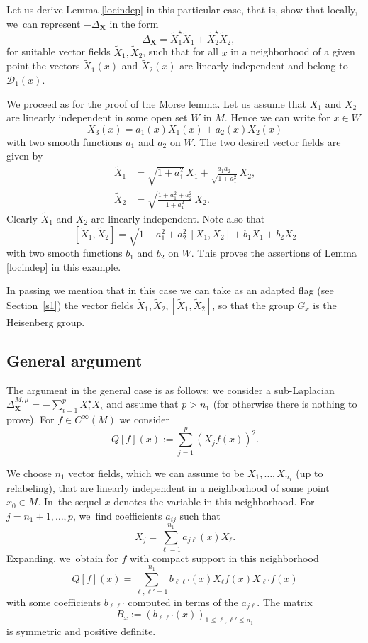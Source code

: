 \documentclass[11pt]{article}
\newcommand{\bX}{{\boldsymbol{X}}}
\theoremstyle{definition}
\let\Xb\bX
\newcommand{\1}{\mathbbm{1}}
\numberwithin{equation}{section}
\begin{document}
Let us derive Lemma \ref{locindep} in this particular case, that is, show that locally, we~can represent $-\Delta_\Xb$ in the form
\[
- \Delta_\Xb = \tilde X_1^\star \tilde X_1 + \tilde X_2^\star \tilde X_2,
\]
for suitable vector fields $\tilde X_1,\tilde X_2$, such that for all $x$ in a neighborhood of a given point the vectors $\tilde X_1(x)$ and $\tilde X_2(x)$ are linearly independent and belong to $\mathcal D_1(x)$.

We proceed as for the proof of the Morse lemma. Let us assume that $X_1$ and $X_2$ are linearly independent in some open set $W$ in $M$. Hence we can write for $x\in W$
\[
X_3(x) = a_1(x) X_1(x) + a_2(x) X_2(x)
\]
with two smooth functions $a_1$ and $a_2$ on $W$. The two desired vector fields are given by
\begin{equation}
\begin{array}{ll}
\tilde X_1 &= \sqrt{1+a_1^2} \,X_1 + \frac{a_1 a_2}{\sqrt{1+ a_1^2}} \,X_2, \\
\tilde X_2 &= \sqrt{\frac{1+ a_1^2 + a_2^2}{1+a_1^2}} \,X_2.
\end{array}
\end{equation}
Clearly $\tilde X_1$ and $\tilde X_2$ are linearly independent. Note also that
\[
[\tilde X_1,\tilde X_2] = \sqrt{1+a_1^2 +a_2^2}\,[X_1,X_2] + b_1 X_1 + b_2 X_2
\]
with two smooth functions $b_1$ and $b_2$ on $W$. This proves the assertions of Lemma \ref{locindep} in this example.

In passing we mention that in this case we can take as an adapted flag (see Section~\ref{s1}) the vector fields $\tilde X_1, \tilde X_2, [\tilde X_1,\tilde X_2] $, so that the group $G_x$ is the Heisenberg group.

\subsection{General argument}
The argument in the general case is as follows: we consider a sub-Laplacian $\Delta_\Xb^{M,\mu} =-\sum_{i=1}^p X_i^\star X_i$ and assume that $p>n_1$ (for otherwise there is nothing to prove). For $f\in C^\infty(M)$ we consider
\[
Q[f](x) := \sum_{j=1}^p (X_j f (x))^2.
\]

We choose $n_1$ vector fields, which we can assume to be $X_1,\ldots,X_{n_1}$ (up to relabeling), that are linearly independent in a neighborhood of some point $x_0\in M$. In~the sequel $x$ denotes the variable in this neighborhood. For $j=n_1+1,\ldots,p$, we~find coefficients $a_{ij}$ such that
\[
X_j=\sum_{\ell=1}^{n_1} a_{j\ell}(x)X_\ell.
\]
Expanding, we~obtain for $f$ with compact support in this neighborhood
\[
Q[f](x)=\sum_{\ell, \ell'=1}^{n_1} b_{\ell \ell'}(x)X_\ell f(x) X_{\ell'}f(x)
\]
with some coefficients $b_{\ell \ell'}$ computed in terms of the $a_{j\ell}$. The matrix
\[
B_x :=(b_{\ell \ell'}(x))_{1\leq \ell,\ell'\leq n_1}
\]
is symmetric and positive definite.
\end{document}
